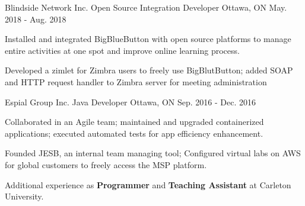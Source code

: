 \begin{cventries}

\cventry
{Blindside Network Inc.}
{Open Source Integration Developer}
{Ottawa, ON}
{May. 2018 - Aug. 2018}
{\begin{cvitems}
    \item {Installed and integrated BigBlueButton with open source platforms to manage entire activities at one spot and improve online learning process.}
    \item {Developed a zimlet for Zimbra users to freely use BigBlutButton; added SOAP and HTTP request handler to Zimbra server for meeting administration} 
\end{cvitems}}

\cventry
{Espial Group Inc.}
{Java Developer}
{Ottawa, ON}
{Sep. 2016 - Dec. 2016}
{\begin{cvitems}
    \item {Collaborated in an Agile team; maintained and upgraded containerized applications; executed automated tests for app efficiency enhancement.}
    \item {Founded JESB, an internal team managing tool; Configured virtual labs on AWS for global customers to freely access the MSP platform.}
\end{cvitems}}

Additional experience as \textbf{Programmer} and \textbf{Teaching Assistant} at Carleton University.
\end{cventries}
